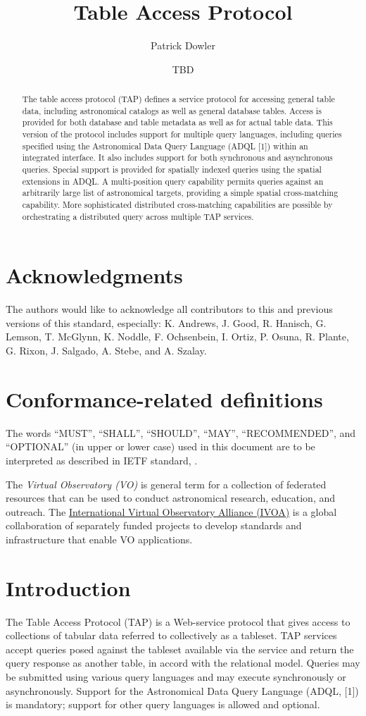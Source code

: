 \documentclass[11pt,a4paper]{ivoa}
\title{Table Access Protocol}
\author{Patrick Dowler}
\author{TBD}
\begin{document}
\begin{abstract}
The table access protocol (TAP) defines a service protocol for accessing general 
table data, including astronomical catalogs as well as general database tables. 
Access is provided for both database and table metadata as well as for actual 
table data. This version of the protocol includes support for multiple query 
languages, including queries specified using the Astronomical Data Query 
Language (ADQL [1]) within an integrated interface. It also includes support 
for both synchronous and asynchronous queries. Special support is provided for
spatially indexed queries using the spatial extensions in ADQL. A multi-position 
query capability permits queries against an arbitrarily large list of 
astronomical targets, providing a simple spatial cross-matching capability. 
More sophisticated distributed cross-matching capabilities are possible by 
orchestrating a distributed query across multiple TAP services.  
\end{abstract}


\section*{Acknowledgments}

The authors would like to acknowledge all contributors to this and previous 
versions of this standard, especially: K. Andrews, J. Good, R. Hanisch, G. 
Lemson, T. McGlynn, K. Noddle, F. Ochsenbein, I. Ortiz, P. Osuna, R. Plante, G. 
Rixon, J. Salgado, A. Stebe, and A. Szalay.


\section*{Conformance-related definitions}

The words ``MUST'', ``SHALL'', ``SHOULD'', ``MAY'', ``RECOMMENDED'', and
``OPTIONAL'' (in upper or lower case) used in this document are to be
interpreted as described in IETF standard, \citet{std:RFC2119}.

The \emph{Virtual Observatory (VO)} is general term for a collection of 
federated resources that can be used to conduct astronomical research, 
education, and outreach. The \href{http://www.ivoa.net}{International
Virtual Observatory Alliance (IVOA)} is a global collaboration of separately 
funded projects to develop standards and infrastructure that enable VO 
applications.


\section{Introduction}
The Table Access Protocol (TAP) is a Web-service protocol that gives access to 
collections of tabular data referred to collectively as a tableset.  TAP 
services accept queries posed against the tableset available via the service and 
return the query response as another table, in accord with the relational model. 
 Queries may be submitted using various query languages and may execute 
synchronously or asynchronously. Support for the Astronomical Data Query 
Language (ADQL, [1]) is mandatory; support for other query languages is allowed 
and optional.
\end{document}
